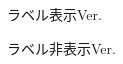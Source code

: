 \documentclass{ltjsarticle}
\begin{document}
\begin{figure}[H]
  \caption{ラベル表示Ver.}
\end{figure}
\begin{figure}[H]
  \caption{ラベル非表示Ver.}
\end{figure}
\end{document}
